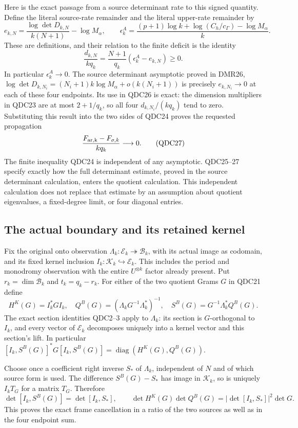 \documentclass[11pt,a4paper]{article}
\begin{document}
Here is the exact passage from a source determinant rate to
this signed quantity. Define the literal source-rate remainder
and the literal upper-rate remainder by
\[
 e_{k,N}=\frac{\log\det D_{k,N}}{k(N+1)}-\log M_\alpha,
 \qquad
 \epsilon_k^A=\frac{(p+1)\log k+\log(C_h/c_\Gamma)-\log M_\alpha}{k}.
 \tag{QDC25}
\]
These are definitions, and their relation to the finite
deficit is the identity
\[
 \frac{d_{k,N}}{kq_k}
   =\frac{N+1}{q_k}(\epsilon_k^A-e_{k,N})\ge0.
 \tag{QDC26}
\]
In particular $\epsilon_k^A\to0$. The source determinant asymptotic proved in DMR26,
$\log\det D_{k,N_i}=(N_i+1)k\log M_\alpha+o(k(N_i+1))$
is precisely $e_{k,N_i}\to0$ at each of these four endpoints.
Its use in QDC26 is exact: the dimension multipliers in
QDC23 are at most $2+1/q_k$, so all four
$d_{k,N_i}/(kq_k)$ tend to zero. Substituting this result
into the two sides of QDC24 proves the requested propagation
\[
 \frac{F_{\rm ar,k}-F_{\sigma,k}}{kq_k}\longrightarrow0.
 \tag{QDC27}
\]
The finite inequality QDC24 is independent of any asymptotic.
QDC25--27 specify exactly how the full determinant estimate,
proved in the source determinant calculation, enters the
quotient calculation. This independent calculation does not
replace that estimate by an assumption about quotient
eigenvalues, a fixed-degree limit, or four diagonal entries.

\subsection{The actual boundary and its retained kernel}

Fix the original onto observation
$\Lambda_k:\mathcal E_k\twoheadrightarrow\mathcal B_k$,
with its actual image as codomain, and its fixed kernel
inclusion $I_k:\mathcal K_k\hookrightarrow\mathcal E_k$.
This includes the period and monodromy observation with the
entire $U^{\otimes k}$ factor already present. Put
$r_k=\dim\mathcal B_k$ and $t_k=q_k-r_k$.
For either of the two quotient Grams $G$ in QDC21 define
\[
 H^K(G)=I_k^*GI_k,\quad
 Q^B(G)=(\Lambda_kG^{-1}\Lambda_k^*)^{-1},\quad
 S^B(G)=G^{-1}\Lambda_k^*Q^B(G).
 \tag{QDC28}
\]
The exact section identities QDC2--3 apply to $\Lambda_k$:
its section is $G$-orthogonal to $I_k$, and every vector
of $\mathcal E_k$ decomposes uniquely into a kernel vector
and this section's lift. In particular
$[I_k,S^B(G)]^*G[I_k,S^B(G)]
 =\operatorname{diag}(H^K(G),Q^B(G))$.

Choose once a coefficient right inverse $S_*$ of $\Lambda_k$,
independent of $N$ and of which source form is used.
The difference $S^B(G)-S_*$ has image in $\mathcal K_k$,
so is uniquely $I_kT_G$ for a matrix $T_G$. Therefore
\[
 \det[I_k,S^B(G)]=\det[I_k,S_*],\qquad
 \det H^K(G)\det Q^B(G)
        =|\det[I_k,S_*]|^2\det G.
 \tag{QDC29}
\]
This proves the exact frame cancellation in a ratio of the
two sources as well as in the four endpoint sum.
\end{document}
